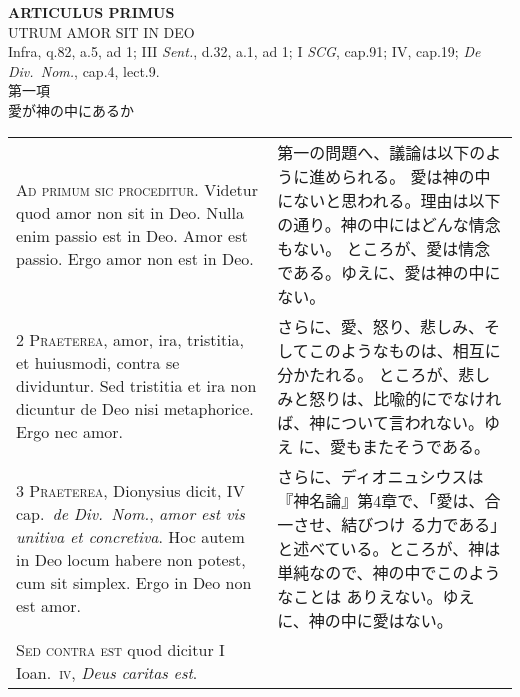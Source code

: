 \documentclass[10pt]{jsarticle} %
\begin{document}
\newpage

\begin{center}
 {\Large {\bf ARTICULUS PRIMUS}}\\
 {\large UTRUM AMOR SIT IN DEO}\\
 {\footnotesize Infra, q.82, a.5, ad 1; III {\itshape Sent.}, d.32, a.1,
 ad 1; I {\itshape SCG}, cap.91; IV, cap.19; {\itshape De Div.~Nom.},
 cap.4, lect.9.}\\
 {\Large 第一項\\愛が神の中にあるか}
\end{center}

\begin{longtable}{p{21em}p{21em}}

{\Huge A}{\scshape d primum sic proceditur}. Videtur quod amor
non sit in Deo. Nulla enim passio est in Deo. Amor est passio. Ergo amor
non est in Deo.


&

第一の問題へ、議論は以下のように進められる。
愛は神の中にないと思われる。理由は以下の通り。神の中にはどんな情念もない。
 ところが、愛は情念である。ゆえに、愛は神の中にない。


\\


{\scshape 2 Praeterea}, amor, ira, tristitia, et
huiusmodi, contra se dividuntur. Sed tristitia et ira non dicuntur de
Deo nisi metaphorice. Ergo nec amor.


&

さらに、愛、怒り、悲しみ、そしてこのようなものは、相互に分かたれる。
ところが、悲しみと怒りは、比喩的にでなければ、神について言われない。ゆえ
 に、愛もまたそうである。



\\


{\scshape 3 Praeterea}, Dionysius dicit, IV cap.~{\itshape de
Div.~Nom.}, {\itshape amor est vis unitiva et concretiva}. Hoc autem in Deo locum
habere non potest, cum sit simplex. Ergo in Deo non est amor.


&

さらに、ディオニュシウスは『神名論』第4章で、「愛は、合一させ、結びつけ
 る力である」と述べている。ところが、神は単純なので、神の中でこのようなことは
 ありえない。ゆえに、神の中に愛はない。

\\


{\scshape Sed contra est} quod dicitur I Ioan.~{\scshape iv}, {\itshape Deus
caritas est}.



\end{longtable}
\end{document}
